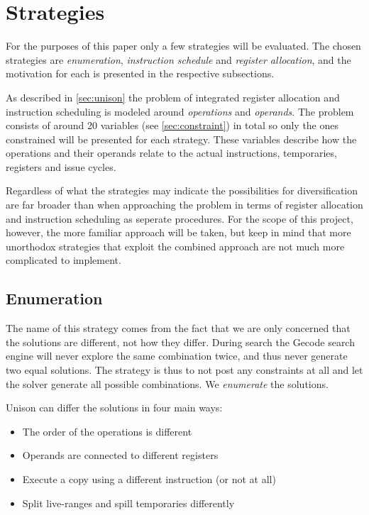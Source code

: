 \section{Strategies}

For the purposes of this paper only a few strategies will be evaluated. The chosen
strategies are \textit{enumeration}, \textit{instruction schedule} and
\textit{register allocation}, and the motivation for each is presented in the respective
subsections.

As described in \ref{sec:unison} the problem of integrated register allocation and
instruction scheduling is modeled around \textit{operations} and \textit{operands}. The
problem consists of around 20 variables (see \ref{sec:constraint}) in total so only the
ones constrained will be presented for each strategy. These variables describe how the
operations and their operands relate to the actual instructions, temporaries, registers
and issue cycles.

Regardless of what the strategies may indicate the possibilities for diversification are
far broader than when approaching the problem in terms of register allocation and instruction
scheduling as seperate procedures. For the scope of this project, however, the more familiar
approach will be taken, but keep in mind that more unorthodox strategies that exploit the
combined approach are not much more complicated to implement.

\subsection{Enumeration}

The name of this strategy comes from the fact that we are only concerned that the solutions
are different, not how they differ. During search the Gecode search engine will never
explore the same combination twice, and thus never generate two equal solutions. The
strategy is thus to not post any constraints at all and let the solver generate all
possible combinations. We \textit{enumerate} the solutions.

Unison can differ the solutions in four main ways:

\begin{itemize}
	\item The order of the operations is different
	\item Operands are connected to different registers
	\item Execute a copy using a different instruction (or not at all)
	\item Split live-ranges and spill temporaries differently
\end{itemize}

